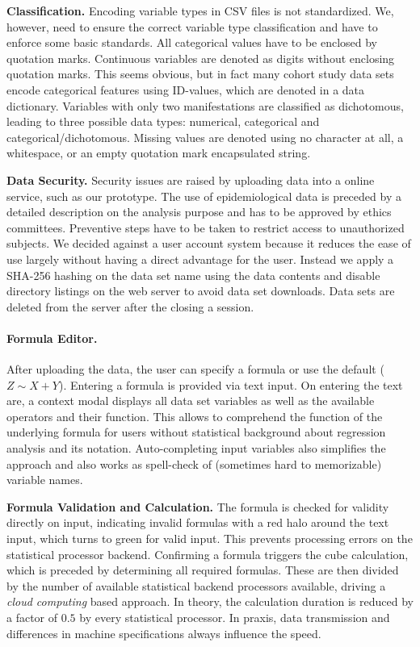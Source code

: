 \documentclass[journal]{style/vgtc} 			          %
\begin{document}
\textbf{Classification.}
Encoding variable types in CSV files is not standardized.
We, however, need to ensure the correct variable type classification and have to enforce some basic standards.
All categorical values have to be enclosed by quotation marks.
Continuous variables are denoted as digits without enclosing quotation marks.
This seems obvious, but in fact many cohort study data sets encode categorical features using ID-values, which are denoted in a data dictionary.
Variables with only two manifestations are classified as dichotomous, leading to three possible data types: numerical, categorical and categorical/dichotomous.
Missing values are denoted using no character at all, a whitespace, or an empty quotation mark encapsulated string.

\textbf{Data Security.}
Security issues are raised by uploading data into a online service, such as our prototype.
The use of epidemiological data is preceded by a detailed description on the analysis purpose and has to be approved by ethics committees.
Preventive steps have to be taken to restrict access to unauthorized subjects.
We decided against a user account system because it reduces the ease of use largely without having a direct advantage for the user.
Instead we apply a SHA-256 hashing on the data set name using the data contents and disable directory listings on the web server to avoid data set downloads.
Data sets are deleted from the server after the closing a session.

\paragraph{Formula Editor.}
After uploading the data, the user can specify a formula or use the default ($Z \sim X + Y$).
Entering a formula is provided via text input.
On entering the text are, a context modal displays all data set variables as well as the available operators and their function.
This allows to comprehend the function of the underlying formula for users without statistical background about regression analysis and its notation.
Auto-completing input variables also simplifies the approach and also works as spell-check of (sometimes hard to memorizable) variable names.

\textbf{Formula Validation and Calculation.} The formula is checked for validity directly on input, indicating invalid formulas with a red halo around the text input, which turns to green for valid input.
This prevents processing errors on the statistical processor backend.
Confirming a formula triggers the cube calculation, which is preceded by determining all required formulas.
These are then divided by the number of available statistical backend processors available, driving a \emph{cloud computing} based approach.
In theory, the calculation duration is reduced by a factor of $0.5$ by every statistical processor.
In praxis, data transmission and differences in machine specifications always influence the speed.
\end{document}
